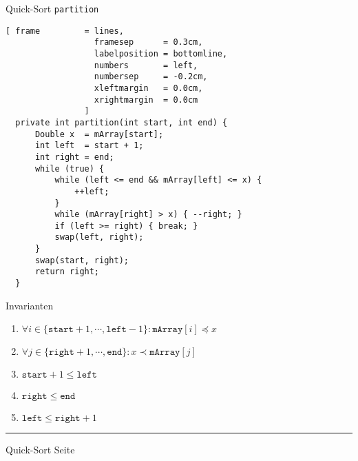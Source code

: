 \documentclass{slides}
\newcounter{mypage}
\begin{document}
\begin{slide}{}
\normalsize

\begin{center}
Quick-Sort \texttt{partition}
\end{center}

\footnotesize
\begin{Verbatim}[ frame         = lines, 
                  framesep      = 0.3cm, 
                  labelposition = bottomline,
                  numbers       = left,
                  numbersep     = -0.2cm,
                  xleftmargin   = 0.0cm,
                  xrightmargin  = 0.0cm
                ]
  private int partition(int start, int end) {
      Double x  = mArray[start];
      int left  = start + 1;
      int right = end;
      while (true) {
          while (left <= end && mArray[left] <= x) {
              ++left;
          }
          while (mArray[right] > x) { --right; }
          if (left >= right) { break; }
          swap(left, right);
      }
      swap(start, right);
      return right;    
  }
\end{Verbatim}

\begin{center}
{\normalsize  Invarianten}
\end{center}
\begin{enumerate}
\item $\forall i \in \{ \mathtt{start}+1, \cdots, \mathtt{left} - 1 \} \colon \mathtt{mArray}[i] \preceq x$
\item $\forall j \in \{ \mathtt{right}+1, \cdots, \mathtt{end} \} \colon x \prec \mathtt{mArray}[j]$
\item $\mathtt{start}+1 \leq \mathtt{left}$ 
\item $\mathtt{right} \leq \mathtt{end}$ 
\item $\mathtt{left} \leq \mathtt{right} + 1$
\end{enumerate}

\vspace*{\fill}
\tiny \addtocounter{mypage}{1}
\rule{17cm}{1mm}
Quick-Sort \hspace*{\fill} Seite 
\end{slide}

\end{document}
